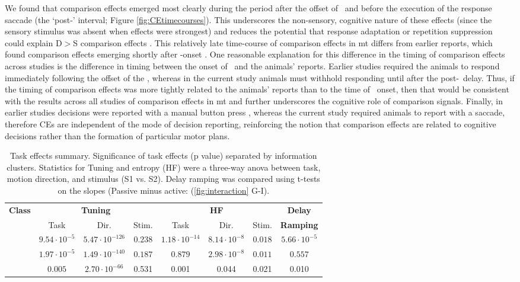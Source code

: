 We found that comparison effects emerged most clearly during the period after the offset of \test\ and before the execution of the response saccade (the `post-\test' interval; Figure \ref{fig:CEtimecourses}).\label{rev:ceTime} 
This underscores the non-sensory, cognitive nature of these effects (since the sensory stimulus was absent when effects were strongest) and reduces the potential that response adaptation or repetition suppression could explain D$>$S comparison effects \parencite{Lui2011,Kohn2003}.
This relatively late time-course of comparison effects in \gls{mt} differs from earlier reports, which found comparison effects emerging shortly after \test-onset \parencite{Lui2011,Zaksas2006}. 
One reasonable explanation for this difference in the timing of comparison effects across studies is the difference in timing between the onset of \test\ and the animals' reports. 
Earlier studies required the animals to respond immediately following the offset of the \test, whereas in the current study animals must withhold responding until after the post-\test\ delay. 
Thus, if the timing of comparison effects was more tightly related to the animals' reports than to the time of \test\ onset, then that would be consistent with the results across all studies of comparison effects in \gls{mt} and further underscores the cognitive role of comparison signals.
Finally, in earlier studies decisions were reported with a manual button press \parencite{Lui2011,Zaksas2006}, whereas the current study required animals to report with a saccade, therefore CEs are independent of the mode of decision reporting, reinforcing the notion that comparison effects are related to cognitive decisions rather than the formation of particular motor plans.


	\begin{table*}
		\begin{tabular}{|c|c|c|c|c|c|c|c|}
			\hline
			\textbf{Class} & \multicolumn{3}{|c|}{\textbf{Tuning}} & \multicolumn{3}{|c|}{\textbf{HF}} & \textbf{Delay} \\
			\cline{2-7}
			& Task & Dir. & Stim. & Task & Dir. & Stim. & \textbf{Ramping}  \\
			\hline
			\textbf{\textcolor{enhanced}{\enhanced}} & $9.54 \cdot 10^{-5}$ & $5.47 \cdot 10^{-126}$ & $0.238$  & $1.18 \cdot 10^{-14}$ & $8.14 \cdot 10^{-8}$ & $0.018$ & $5.66 \cdot 10^{-5}$ \\
			\textbf{\textcolor{suppressed}{\suppressed}} & $1.97 \cdot 10^{-5}$ & $1.49 \cdot 10^{-140}$ & $0.187$ & $0.879$ & $2.98 \cdot 10^{-8}$ & $0.011$ & $0.557$ \\
			\textbf{\consistent} & $0.005$ & $2.70 \cdot 10^{-66}$ & 0.531 & 0.001 & 0.044 & 0.021 & 0.010 \\
			\hline
		\end{tabular}
		\caption{Task effects summary. Significance of task effects (p value) separated by information clusters. Statistics for Tuning and entropy (HF) were a three-way anova between task, motion direction, and stimulus (S1 vs. S2). Delay ramping was compared using t-tests on the slopes (Passive minus active: (\ref{fig:interaction} G-I).}
	\end{table*}
	\addtocounter{page}{-1}
	\thispagestyle{empty}
	\clearpage


